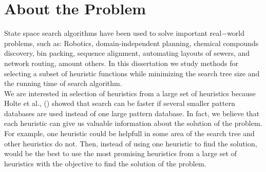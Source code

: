 

\chapter{About the Problem}\label{aboutTheProblem}
\noindent
State space search algorithms have been used to solve important real$-$world problems, such as: Robotics, domain-independent planning, chemical compounds discovery, bin packing, sequence alignment, automating layouts of sewers, and network routing, amount others. In this dissertation we study methods for selecting a subset of heuristic functions while minimizing the search tree size and the running time of search algorithm.\\

We are interested in selection of heuristics from a large set of heuristics because Holte et al., (\citeyear{holte2006maximizing}) showed that search can be faster if several smaller pattern databases are used instead of one large pattern database. In fact, we believe that each heuristic can give us valuable information about the solution of the problem. For example, one heuristic could be helpfull in some area of the search tree and other heuristics do not. Then, instead of using one heuristic to find the solution, would be the best to use the most promising heuristics from a large set of heuristics with the objective to find the solution of the problem.\\

